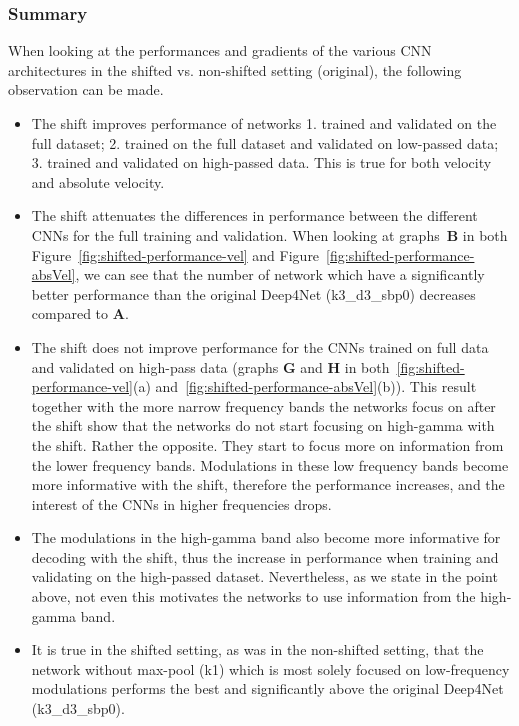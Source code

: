 \subsubsection{Summary}\label{subsubsec:centre-shiftig-summary}
When looking at the performances and gradients of the various CNN architectures in the shifted vs. non-shifted setting (original), the following observation can be made.
\begin{itemize}
    \item The shift improves performance of networks 1. trained and validated on the full dataset; 2. trained on the full dataset and validated on low-passed data;
    3. trained and validated on high-passed data. This is true for both velocity and absolute velocity.
    
    \item The shift attenuates the differences in performance between the different CNNs for the full training and validation.
    When looking at graphs~\textbf{B} in both Figure~\ref{fig:shifted-performance-vel} and Figure~\ref{fig:shifted-performance-absVel}, we can see that the number of network which have a significantly better performance than the original Deep4Net (k3\_d3\_sbp0) decreases compared to \textbf{A}.
    
    \item The shift does not improve performance for the CNNs trained on full data and validated on high-pass data (graphs \textbf{G} and \textbf{H} in both~\ref{fig:shifted-performance-vel}(a) and~\ref{fig:shifted-performance-absVel}(b)).
    This result together with the more narrow frequency bands the networks focus on after the shift show that the networks do not start focusing on high-gamma with the shift.
    Rather the opposite.
    They start to focus more on information from the lower frequency bands.
    Modulations in these low frequency bands become more informative with the shift, therefore the performance increases, and the interest of the CNNs in higher frequencies drops.
    
    \item The modulations in the high-gamma band also become more informative for decoding with the shift, thus the increase in performance when training and validating on the high-passed dataset.
    Nevertheless, as we state in the point above, not even this motivates the networks to use information from the high-gamma band.
    
    \item It is true in the shifted setting, as was in the non-shifted setting, that the network without max-pool (k1) which is most solely focused on low-frequency modulations performs the best and significantly above the original Deep4Net (k3\_d3\_sbp0).
    
   
\end{itemize}

